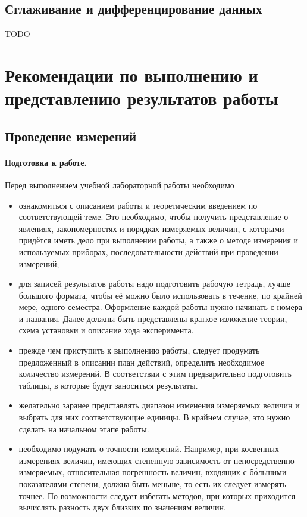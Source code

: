 \documentclass[10pt]{article}
\begin{document}
\subsection{Сглаживание и дифференцирование данных}

TODO

\section{Рекомендации по выполнению и представлению результатов работы}

\subsection{Проведение измерений}

\paragraph{Подготовка к работе.}

\begin{lyxgreyedout}
Перед выполнением учебной лабораторной работы необходимо
\begin{itemize}
\item ознакомиться с описанием работы и теоретическим введением по соответствующей
теме. Это необходимо, чтобы получить представление о явлениях, закономерностях
и порядках измеряемых величин, с которыми придётся иметь дело при
выполнении работы, а также о методе измерения и используемых приборах,
последовательности действий при проведении измерений;
\item для записей результатов работы надо подготовить рабочую тетрадь, лучше
большого формата, чтобы её можно было использовать в течение, по крайней
мере, одного семестра. Оформление каждой работы нужно начинать с номера
и названия. Далее должны быть представлены краткое изложение теории,
схема установки и описание хода эксперимента.
\item прежде чем приступить к выполнению работы, следует продумать предложенный
в описании план действий, определить необходимое количество измерений.
В соответствии с этим предварительно подготовить таблицы, в которые
будут заноситься результаты. 
\item желательно заранее представлять диапазон изменения измеряемых величин
и выбрать для них соответствующие единицы. В крайнем случае, это нужно
сделать на начальном этапе работы. 
\item необходимо подумать о точности измерений. Например, при косвенных
измерениях величин, имеющих степенную зависимость от непосредственно
измеряемых, относительная погрешность величин, входящих с б\'{о}льшими
показателями степени, должна быть меньше, то есть их следует измерять
точнее. По возможности следует избегать методов, при которых приходится
вычислять разность двух близких по значениям величин.
\end{itemize}
\end{lyxgreyedout}
\end{document}

